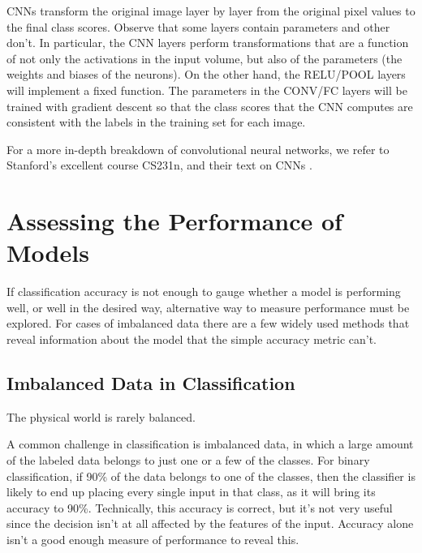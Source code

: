 \noindent CNNs transform the original image layer by layer from the original
pixel values to the final class scores. Observe that some layers contain
parameters and other don’t. In particular, the CNN layers perform
transformations that are a function of not only the activations in the
input volume, but also of the parameters (the weights and biases of
the neurons). On the other hand, the RELU/POOL layers will implement a
fixed function. The parameters in the CONV/FC layers will be trained
with gradient descent so that the class scores that the CNN computes
are consistent with the labels in the training set for each image.

\noindent For a more in-depth breakdown of convolutional neural networks,
we refer to Stanford's excellent course CS231n, and their text on CNNs \cite{cs231n}.



\section{Assessing the Performance of Models}
If classification accuracy is not enough to gauge whether a model is
performing well, or well in the desired way, alternative way to measure
performance must be explored. For cases of imbalanced data there are a few
widely used methods that reveal information about the model that the simple
accuracy metric can't.

\subsection{Imbalanced Data in Classification}
The physical world is rarely balanced.

A common challenge in classification is imbalanced data, in which a large
amount of the labeled data belongs to just one or a few of the classes.
For binary classification, if 90\% of the data belongs to one of the classes,
then the classifier is likely to end up placing every single
input in that class, as it will bring its accuracy to 90\%. Technically, this
accuracy is correct, but it's not very useful since the decision isn't at all
affected by the features of the input. Accuracy alone isn't a good enough
measure of performance to reveal this.


